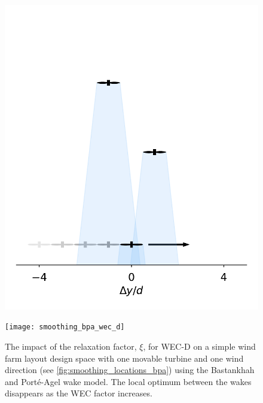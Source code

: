 \documentclass{jpconf}
\begin{document}
\begin{figure}[h!]
	\centering
	\begin{minipage}[t]{0.47\textwidth}
		\centering
		\includegraphics[width=\textwidth, trim={-2.0cm -0.0cm -2.0cm 3.5cm}, clip]{final_images/layouts/3turb-design-space}
		\caption{Simple wind farm, seen from above, used to demonstrate the effects of the WEC factors, $\theta_\xi$ and $\xi$, on the wind farm layout design space (see \cref{fig:smoothing_bpa_wec_d}). Wind is from the top.}
		\label{fig:smoothing_locations_bpa}
	\end{minipage}\hspace{1pc}
	\begin{minipage}[t]{0.47\textwidth}
		\centering
		\texttt{[image: smoothing\_bpa\_wec\_d]}
		\caption{The impact of the relaxation factor, $\xi$, for WEC-D on a simple wind farm layout design space with one movable turbine and one wind direction (see \cref{fig:smoothing_locations_bpa}) using the Bastankhah and Port\'{e}-Agel wake model. The local optimum between the wakes disappears as the WEC factor increases.}
		\label{fig:smoothing_bpa_wec_d}
	\end{minipage} %
\end{figure}
\end{document}
